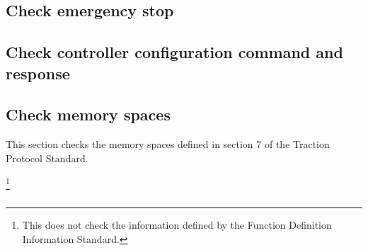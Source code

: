 \subsection{Check emergency stop}

\subsection{Check controller configuration command and response}

\subsection{Check memory spaces}

This section checks the memory spaces defined in section 7
of the Traction Protocol Standard.

\footnote{This does not check the information defined by the 
    Function Definition Information Standard.
}
    
\subsection{}

  
